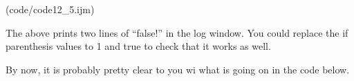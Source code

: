 (code/code12_5.ijm)

The above prints two lines of ``false!'' in the log window. You could replace
the if parenthesis values to 1 and true to check that it works as well.

By now, it is probably pretty clear to you wi what is going on in the code below.